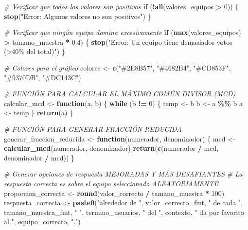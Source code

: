 \documentclass[
]{article}
\newenvironment{Shaded}{\begin{snugshade}}{\end{snugshade}}
\newcommand{\CommentTok}[1]{\textcolor[rgb]{0.56,0.35,0.01}{\textit{#1}}}
\newcommand{\ControlFlowTok}[1]{\textcolor[rgb]{0.13,0.29,0.53}{\textbf{#1}}}
\newcommand{\DecValTok}[1]{\textcolor[rgb]{0.00,0.00,0.81}{#1}}
\newcommand{\FloatTok}[1]{\textcolor[rgb]{0.00,0.00,0.81}{#1}}
\newcommand{\FunctionTok}[1]{\textcolor[rgb]{0.13,0.29,0.53}{\textbf{#1}}}
\newcommand{\NormalTok}[1]{#1}
\newcommand{\OtherTok}[1]{\textcolor[rgb]{0.56,0.35,0.01}{#1}}
\newcommand{\SpecialCharTok}[1]{\textcolor[rgb]{0.81,0.36,0.00}{\textbf{#1}}}
\newcommand{\StringTok}[1]{\textcolor[rgb]{0.31,0.60,0.02}{#1}}
\begin{document}
\begin{Shaded}
\begin{Highlighting}[]
\CommentTok{\# Verificar que todos los valores son positivos}
\ControlFlowTok{if}\NormalTok{ (}\SpecialCharTok{!}\FunctionTok{all}\NormalTok{(valores\_equipos }\SpecialCharTok{\textgreater{}} \DecValTok{0}\NormalTok{)) \{}
  \FunctionTok{stop}\NormalTok{(}\StringTok{"Error: Algunos valores no son positivos"}\NormalTok{)}
\NormalTok{\}}

\CommentTok{\# Verificar que ningún equipo domina excesivamente}
\ControlFlowTok{if}\NormalTok{ (}\FunctionTok{max}\NormalTok{(valores\_equipos) }\SpecialCharTok{\textgreater{}}\NormalTok{ tamano\_muestra }\SpecialCharTok{*} \FloatTok{0.4}\NormalTok{) \{}
  \FunctionTok{stop}\NormalTok{(}\StringTok{"Error: Un equipo tiene demasiados votos (\textgreater{}40\% del total)"}\NormalTok{)}
\NormalTok{\}}

\CommentTok{\# Colores para el gráfico}
\NormalTok{colores }\OtherTok{\textless{}{-}} \FunctionTok{c}\NormalTok{(}\StringTok{"\#2E8B57"}\NormalTok{, }\StringTok{"\#4682B4"}\NormalTok{, }\StringTok{"\#CD853F"}\NormalTok{, }\StringTok{"\#9370DB"}\NormalTok{, }\StringTok{"\#DC143C"}\NormalTok{)}

\CommentTok{\# FUNCIÓN PARA CALCULAR EL MÁXIMO COMÚN DIVISOR (MCD)}
\NormalTok{calcular\_mcd }\OtherTok{\textless{}{-}} \ControlFlowTok{function}\NormalTok{(a, b) \{}
  \ControlFlowTok{while}\NormalTok{ (b }\SpecialCharTok{!=} \DecValTok{0}\NormalTok{) \{}
\NormalTok{    temp }\OtherTok{\textless{}{-}}\NormalTok{ b}
\NormalTok{    b }\OtherTok{\textless{}{-}}\NormalTok{ a }\SpecialCharTok{\%\%}\NormalTok{ b}
\NormalTok{    a }\OtherTok{\textless{}{-}}\NormalTok{ temp}
\NormalTok{  \}}
  \FunctionTok{return}\NormalTok{(a)}
\NormalTok{\}}

\CommentTok{\# FUNCIÓN PARA GENERAR FRACCIÓN REDUCIDA}
\NormalTok{generar\_fraccion\_reducida }\OtherTok{\textless{}{-}} \ControlFlowTok{function}\NormalTok{(numerador, denominador) \{}
\NormalTok{  mcd }\OtherTok{\textless{}{-}} \FunctionTok{calcular\_mcd}\NormalTok{(numerador, denominador)}
  \FunctionTok{return}\NormalTok{(}\FunctionTok{c}\NormalTok{(numerador }\SpecialCharTok{/}\NormalTok{ mcd, denominador }\SpecialCharTok{/}\NormalTok{ mcd))}
\NormalTok{\}}

\CommentTok{\# Generar opciones de respuesta MEJORADAS Y MÁS DESAFIANTES}
\CommentTok{\# La respuesta correcta es sobre el equipo seleccionado ALEATORIAMENTE}
\NormalTok{proporcion\_correcta }\OtherTok{\textless{}{-}} \FunctionTok{round}\NormalTok{(valor\_correcto }\SpecialCharTok{/}\NormalTok{ tamano\_muestra }\SpecialCharTok{*} \DecValTok{100}\NormalTok{)}
\NormalTok{respuesta\_correcta }\OtherTok{\textless{}{-}} \FunctionTok{paste0}\NormalTok{(}\StringTok{"alrededor de "}\NormalTok{, valor\_correcto\_fmt, }\StringTok{" de cada "}\NormalTok{, tamano\_muestra\_fmt, }\StringTok{" "}\NormalTok{,}
\NormalTok{                            termino\_usuarios, }\StringTok{" del "}\NormalTok{, contexto, }\StringTok{" da por favorito al "}\NormalTok{, equipo\_correcto, }\StringTok{"."}\NormalTok{)}


\end{Highlighting}
\end{Shaded}
\end{document}
